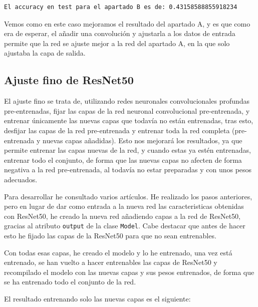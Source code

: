 \documentclass[12pt, spanish]{article}
\begin{document}
\begin{lstlisting}
El accuracy en test para el apartado B es de: 0.43158588855918234
\end{lstlisting}

Vemos como en este caso mejoramos el resultado del apartado A, y es que como era de esperar, el añadir una convolución y ajustarla a los datos de entrada permite que la red se ajuste mejor a la red del apartado A, en la que solo ajustaba la capa de salida.


\subsection{Ajuste fino de ResNet50}

El ajuste fino\cite{finetuningkeras} se trata de, utilizando redes neuronales convolucionales profundas pre-entrenadas, fijar las capas de la red neuronal convolucional pre-entrenada, y entrenar únicamente las nuevas capas que todavía no están entrenadas, tras esto, desfijar las capas de la red pre-entrenada y entrenar toda la red completa (pre-entrenada y nuevas capas añadidas). Esto nos mejorará los resultados, ya que permite entrenar las capas nuevas de la red, y cuando estas ya estén entrenadas, entrenar todo el conjunto, de forma que las nuevas capas no afecten de forma negativa a la red pre-entrenada, al todavía no estar preparadas y con unos pesos adecuados.

Para desarrollar he consultado varios artículos\cite{finetuningkeras}\cite{finetuning}. He realizado los pasos anteriores, pero en lugar de dar como entrada a la nueva red las caracteristicas obtenidas con ResNet50, he creado la nueva red añadiendo capas a la red de ResNet50, gracias al atributo \texttt{output} de la clase \texttt{Model}. Cabe destacar que antes de hacer esto he fijado las capas de la ResNet50 para que no sean entrenables.

Con todas esas capas, he creado el modelo y lo he entrenado, una vez está entrenado, se han vuelto a hacer entrenables las capas de ResNet50 y recompilado el modelo con las nuevas capas y sus pesos entrenados, de forma que se ha entrenado todo el conjunto de la red.

El resultado entrenando solo las nuevas capas es el siguiente:
\end{document}

